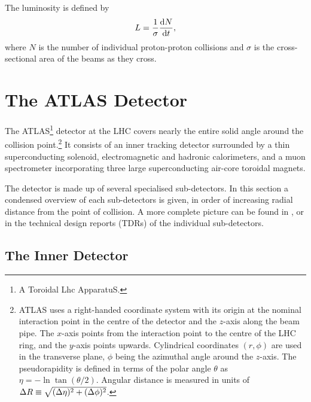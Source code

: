 The luminosity is defined by
%
\begin{equation}\label{eq:lumi_def}
L = \frac{1}{\sigma} \frac{\mathrm{d}N}{\mathrm{d}t} ,
\end{equation}
%
where $N$ is the number of individual proton-proton collisions and $\sigma$ is the cross-sectional area of the beams as they cross.



\section{The ATLAS Detector}\label{sec:atlas_detector}

\newcommand{\AtlasCoordFootnote}{%
ATLAS uses a right-handed coordinate system with its origin at the nominal interaction point in the centre of the detector and the \(z\)-axis along the beam pipe. The \(x\)-axis points from the interaction point to the centre of the LHC ring, and the \(y\)-axis points upwards. Cylindrical coordinates \((r,\phi)\) are used in the transverse plane, \(\phi\) being the azimuthal angle around the \(z\)-axis. The pseudorapidity is defined in terms of the polar angle \(\theta\) as \(\eta = -\ln \tan(\theta/2)\). Angular distance is measured in units of \(\DeltaR \equiv \sqrt{(\Delta\eta)^{2} + (\Delta\phi)^{2}}\).}

The ATLAS\footnote{A Toroidal Lhc ApparatuS.} detector at the LHC covers nearly the entire solid angle around the collision point.\footnote{\AtlasCoordFootnote}
It consists of an inner tracking detector surrounded by a thin superconducting solenoid, electromagnetic and hadronic calorimeters,
and a muon spectrometer incorporating three large superconducting air-core toroidal magnets.

The detector is made up of several specialised sub-detectors. 
In this section a condensed overview of each sub-detectors is given, in order of increasing radial distance from the point of collision.
A more complete picture can be found in , or in the technical design reports (TDRs) of the individual sub-detectors.



\subsection{The Inner Detector}

